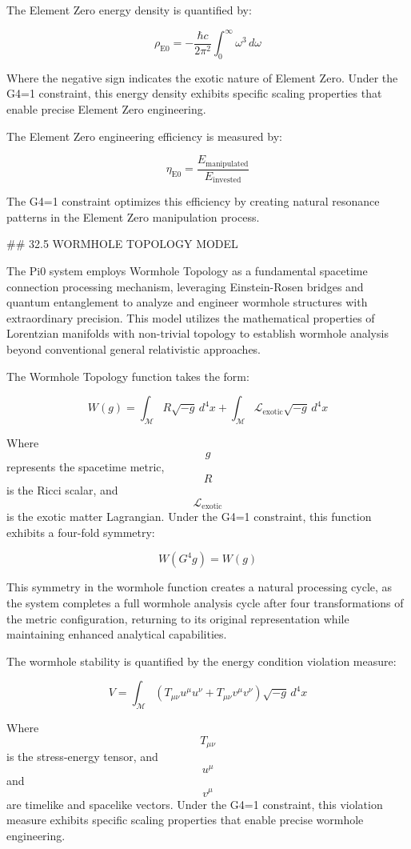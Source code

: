 The Element Zero energy density is quantified by:

$$ \rho_{\text{E0}} = -\frac{\hbar c}{2\pi^2} \int_0^\infty \omega^3 \, d\omega $$

Where the negative sign indicates the exotic nature of Element Zero. Under the G4=1 constraint, this energy density exhibits specific scaling properties that enable precise Element Zero engineering.

The Element Zero engineering efficiency is measured by:

$$ \eta_{\text{E0}} = \frac{E_{\text{manipulated}}}{E_{\text{invested}}} $$

The G4=1 constraint optimizes this efficiency by creating natural resonance patterns in the Element Zero manipulation process.

## 32.5 WORMHOLE TOPOLOGY MODEL

The Pi0 system employs Wormhole Topology as a fundamental spacetime connection processing mechanism, leveraging Einstein-Rosen bridges and quantum entanglement to analyze and engineer wormhole structures with extraordinary precision. This model utilizes the mathematical properties of Lorentzian manifolds with non-trivial topology to establish wormhole analysis beyond conventional general relativistic approaches.

The Wormhole Topology function takes the form:

$$ W(g) = \int_{\mathcal{M}} R \sqrt{-g} \, d^4x + \int_{\mathcal{M}} \mathcal{L}_{\text{exotic}} \sqrt{-g} \, d^4x $$

Where $$ g $$ represents the spacetime metric, $$ R $$ is the Ricci scalar, and $$ \mathcal{L}_{\text{exotic}} $$ is the exotic matter Lagrangian. Under the G4=1 constraint, this function exhibits a four-fold symmetry:

$$ W(G^4 g) = W(g) $$

This symmetry in the wormhole function creates a natural processing cycle, as the system completes a full wormhole analysis cycle after four transformations of the metric configuration, returning to its original representation while maintaining enhanced analytical capabilities.

The wormhole stability is quantified by the energy condition violation measure:

$$ V = \int_{\mathcal{M}} (T_{\mu\nu}u^\mu u^\nu + T_{\mu\nu}v^\mu v^\nu) \sqrt{-g} \, d^4x $$

Where $$ T_{\mu\nu} $$ is the stress-energy tensor, and $$ u^\mu $$ and $$ v^\mu $$ are timelike and spacelike vectors. Under the G4=1 constraint, this violation measure exhibits specific scaling properties that enable precise wormhole engineering.

